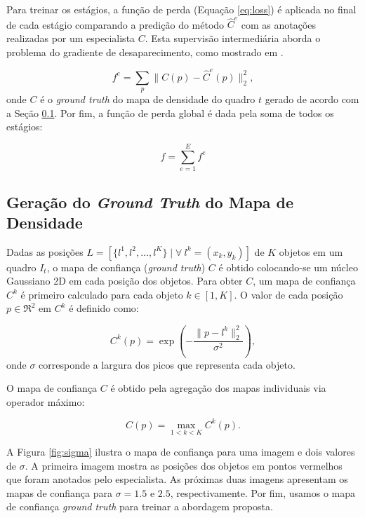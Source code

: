 Para treinar os estágios, a função de perda (Equação \ref{eq:loss}) é aplicada no final de cada estágio comparando a predição do método $\hat{C}^{e}$ com as anotações realizadas por um especialista $C$.
Esta supervisão intermediária aborda o problema do gradiente de desaparecimento, como mostrado em \cite{Cao2017}.

\begin{equation}
f^{e} = \sum_p \parallel C(p) - \hat{C}^{e}(p)\parallel^2_2,
\label{eq:loss}
\end{equation}
onde $C$ é o \textit{ground truth} do mapa de densidade do quadro $t$ gerado de acordo com a Seção \ref{sec:geracao_mapa}. Por fim, a função de perda global é dada pela soma de todos os estágios:

\begin{equation}
f = \sum_{e=1}^{E} f^{e}
\end{equation}

\subsection{Geração do \textit{Ground Truth} do Mapa de Densidade}
\label{sec:geracao_mapa}

Dadas as posições $L = [\{l^1, l^2, \dots, l^K \} \mid \forall \: l^k = (x_k, y_k)]$ de $K$ objetos em um quadro $I_t$, o mapa de confiança (\textit{ground truth}) $C$ é obtido colocando-se um núcleo Gaussiano 2D em cada posição dos objetos.
Para obter $C$, um mapa de confiança $C^k$ é primeiro calculado para cada objeto $k \in [1, K]$.
O valor de cada posição $p \in \Re^2$ em $C^k$ é definido como:

\begin{equation}
C^k(p) = \exp \left(- \frac{\| p - l^k \|^2_2}{\sigma^2}\right),
\end{equation}
onde $\sigma$ corresponde a largura dos picos que representa cada objeto.




O mapa de confiança $C$ é obtido pela agregação dos mapas individuais via operador máximo:

\begin{equation}
C(p) = \max_{1<k<K} C^k(p).
\end{equation}

A Figura \ref{fig:sigma} ilustra o mapa de confiança para uma imagem e dois valores de $\sigma$.
A primeira imagem mostra as posições dos objetos em pontos vermelhos que foram anotados pelo especialista.
As próximas duas imagens apresentam os mapas de confiança para $\sigma = 1.5$ e $2.5$, respectivamente.
Por fim, usamos o mapa de confiança \textit{ground truth} para treinar a abordagem proposta.

